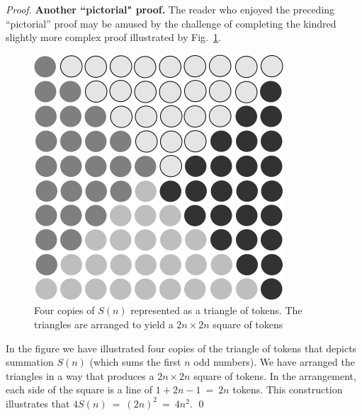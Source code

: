 \begin{proof}
{\bf Another ``pictorial" proof.}
The reader who enjoyed the preceding ``pictorial'' proof may be amused by the challenge of completing the kindred slightly more complex proof illustrated by Fig.~\ref{fig:anotherSumOdds}.
\begin{figure}[htb]
\begin{center}
       \includegraphics[scale=0.35]{FiguresMaths/Deltaodd}
\caption{Four copies of $S(n)$ represented as a triangle of tokens.  The triangles are arranged to yield a $2n \times 2n$ square of tokens}
       \label{fig:anotherSumOdds}
\end{center}
\end{figure}
In the figure we have illustrated four copies of the triangle of tokens that depicts summation $S(n)$ (which sums the first $n$ odd numbers).  We have arranged the triangles in a way that produces a $2n \times 2n$ square of tokens.  In the arrangement, each side of the square is a line of $1+2n-1 \ = \ 2n$ tokens.  This construction illustrates that $4 S(n) \ = \ (2n)^2  \ = \ 4n^2$.  \qed
\end{proof}

\medskip

